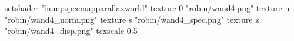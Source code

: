 setshader "bumpspecmapparallaxworld"
   texture 0 "robin/wand4.png"
   texture n "robin/wand4_norm.png"
   texture s "robin/wand4_spec.png"
   texture z "robin/wand4_disp.png"
texscale 0.5